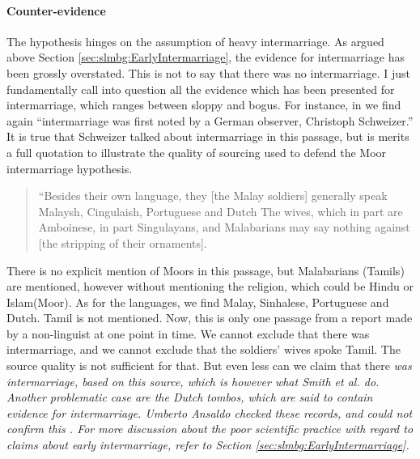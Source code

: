 \paragraph{Counter-evidence}
The hypothesis hinges on the assumption of heavy intermarriage. As argued above Section \ref{sec:slmbg:EarlyIntermarriage}, the evidence for intermarriage has been grossly overstated. This is not to say that there was no intermarriage. I just fundamentally call into question all the evidence which has been presented for intermarriage, which ranges between sloppy and bogus. For instance, in \citet[176]{SmithEtAl2007} we find again ``intermarriage was first noted by a German observer, Christoph Schweizer.'' It is true that Schweizer talked about intermarriage in this passage, but is merits a full quotation to illustrate the quality of sourcing used to defend the Moor intermarriage hypothesis.

\begin{quote}
    ``Besides their own language, they [the Malay soldiers] generally speak Malaysh, Cingulaish, Portuguese and Dutch \el The wives, which in part are Amboinese, in part Singulayans, and Malabarians may say nothing against [the stripping of their ornaments].
\end{quote}

There is no explicit mention of Moors in this passage, but Malabarians (Tamils) are mentioned, however without mentioning the religion, which could be Hindu or Islam(Moor). As for the languages, we find Malay, Sinhalese, Portuguese and Dutch. Tamil is not mentioned. Now, this is only one passage from a report made by a non-linguist at one point in time. We cannot exclude that there was intermarriage, and we cannot exclude that the soldiers' wives spoke Tamil. The source quality is not sufficient for that. But even less can we claim that there \em was \em intermarriage, based on this source, which is however what Smith et al. do. Another problematic case are the Dutch tombos, which are said to contain evidence for intermarriage. Umberto Ansaldo checked these records, and could not confirm this \citep{Ansaldo2008genesis}. For more discussion about the poor scientific practice with regard to claims about early intermarriage, refer to Section \ref{sec:slmbg:EarlyIntermarriage}.

